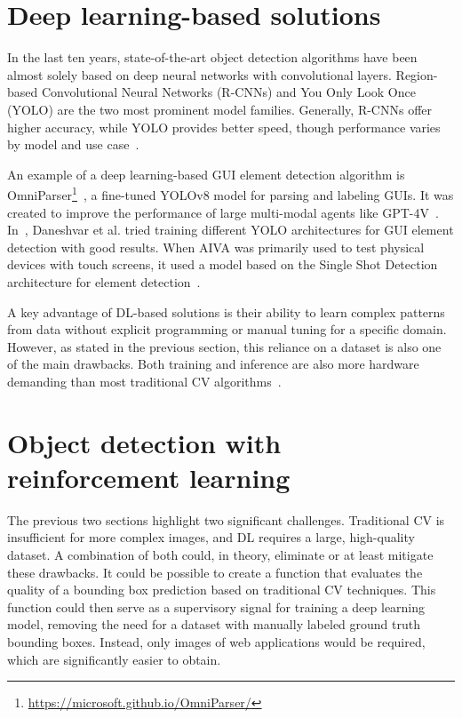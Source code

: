 \documentclass[
  digital,     %
  oneside,     %
  nosansbold,  %
  nocolorbold, %
  lof,         %
  lot,         %
]{fithesis4}
\begin{document}
\section{Deep learning-based solutions}
In the last ten years, state-of-the-art object detection algorithms have been almost solely based on deep neural networks with convolutional layers. Region-based Convolutional Neural Networks (R-CNNs) and You Only Look Once (YOLO) are the two most prominent model families. Generally, R-CNNs offer higher accuracy, while YOLO provides better speed, though performance varies by model and use case~\cite{ObjectDetectionHistorySurvey}.

An example of a deep learning-based GUI element detection algorithm is OmniParser\footnote{\url{https://microsoft.github.io/OmniParser/}}~, a fine-tuned YOLOv8 model for parsing and labeling GUIs. It was created to improve the performance of large multi-modal agents like GPT-4V~\cite{OmniParser}. In~\cite{GUI_YOLO_comparison}, Daneshvar et al. tried training different YOLO architectures for GUI element detection with good results. When AIVA was primarily used to test physical devices with touch screens, it used a model based on the Single Shot Detection architecture for element detection~\cite{Horak2020thesis}.

A key advantage of DL-based solutions is their ability to learn complex patterns from data without explicit programming or manual tuning for a specific domain. However, as stated in the previous section, this reliance on a dataset is also one of the main drawbacks. Both training and inference are also more hardware demanding than most traditional CV algorithms~\cite{DLvsTCV}.

\section{Object detection with reinforcement learning}

The previous two sections highlight two significant challenges. Traditional CV is insufficient for more complex images, and DL requires a large, high-quality dataset. A combination of both could, in theory, eliminate or at least mitigate these drawbacks. It could be possible to create a function that evaluates the quality of a bounding box prediction based on traditional CV techniques. This function could then serve as a supervisory signal for training a deep learning model, removing the need for a dataset with manually labeled ground truth bounding boxes. Instead, only images of web applications would be required, which are significantly easier to obtain.
\end{document}
